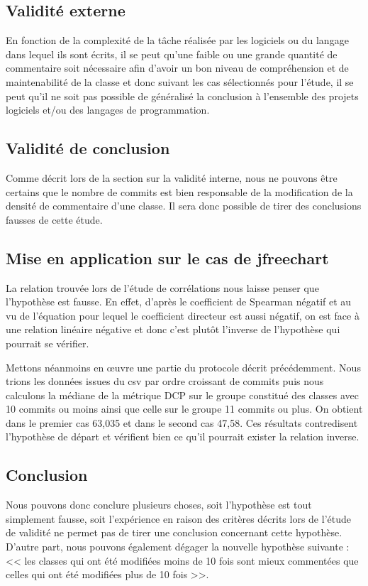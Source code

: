 \documentclass[11pt]{rapport-tp-qlm}
\begin{document}
\subsection{Validité externe}
En fonction de la complexité de la tâche réalisée par les logiciels ou du langage dans lequel ils sont écrits, il se peut qu'une faible ou une grande quantité de commentaire soit nécessaire afin d'avoir un bon niveau de compréhension et de maintenabilité de la classe et donc suivant les cas sélectionnés pour l'étude, il se peut qu'il ne soit pas possible de généralisé la conclusion à l'ensemble des projets logiciels et/ou des langages de programmation.
\subsection{Validité de conclusion}
Comme décrit lors de la section sur la validité interne, nous ne pouvons être certains que le nombre de commits est bien responsable de la modification de la densité de commentaire d'une classe. Il sera donc possible de tirer des conclusions fausses de cette étude.
\subsection{Mise en application sur le cas de jfreechart}


La relation trouvée lors de l'étude de corrélations nous laisse penser que l'hypothèse est fausse. En effet, d'après le coefficient de Spearman négatif et au vu de l'équation pour lequel le coefficient directeur est aussi négatif, on est face à une relation linéaire négative et donc c'est plutôt l'inverse de l'hypothèse qui pourrait se vérifier.


Mettons néanmoins en œuvre une partie du protocole décrit précédemment. Nous trions les données issues du csv par ordre croissant de commits puis nous calculons la médiane de la métrique DCP sur le groupe constitué des classes avec 10 commits ou moins ainsi que celle sur le groupe 11 commits ou plus. On obtient dans le premier cas 63,035 et dans le second cas 47,58. Ces résultats contredisent l'hypothèse de départ et vérifient bien ce qu'il pourrait exister la relation inverse.



\subsection{Conclusion}


Nous pouvons donc conclure plusieurs choses, soit l'hypothèse est tout simplement fausse, soit l'expérience en raison des critères décrits lors de l'étude de validité ne permet pas de tirer une conclusion concernant cette hypothèse. D'autre part, nous pouvons également dégager la nouvelle hypothèse suivante : << les classes qui ont été modifiées moins de 10 fois sont mieux commentées que celles qui ont été modifiées plus de 10 fois >>.
\end{document}

